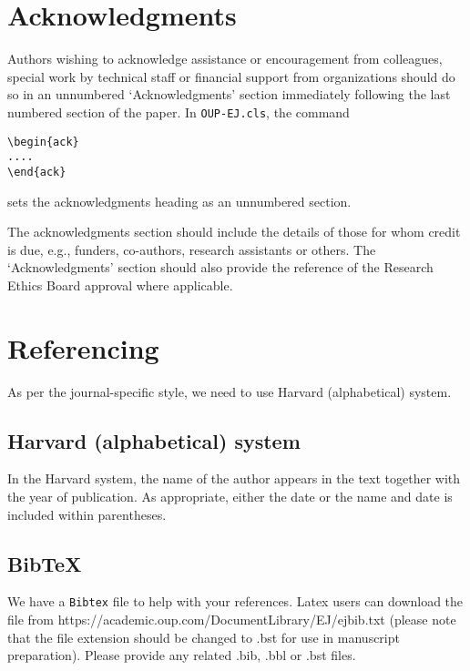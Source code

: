 \documentclass{OUP-EJ}
\begin{document}
\section{Acknowledgments}
Authors wishing to acknowledge assistance or encouragement from
colleagues, special work by technical staff or financial support from
organizations should do so in an unnumbered `Acknowledgments' section
immediately following the last numbered section of the paper. In \verb"OUP-EJ.cls", the
command

\begin{verbatim}
\begin{ack}
....
\end{ack}
\end{verbatim}
sets the acknowledgments heading as an unnumbered
section.

The acknowledgments section should include the details of those for whom credit is due,
e.g., funders, co-authors, research assistants or others. The `Acknowledgments' section
should also provide the reference of the Research Ethics Board approval where applicable.



\clearpage

\section{Referencing\label{except}}

As per the journal-specific style, we need to use Harvard (alphabetical) system.




\subsection{Harvard (alphabetical) system}
In the Harvard system, the name of the author appears in the text together
with the year of publication. As appropriate, either the date or the name
and date is included within parentheses.

\subsection{BibTeX}

We have a \verb+Bibtex+ file to help with your references. Latex users can download the file from https://academic.oup.com/DocumentLibrary/EJ/ejbib.txt
(please note that the file extension should be changed to .bst for use in manuscript
preparation). Please provide any related .bib, .bbl or .bst files.
\end{document}
